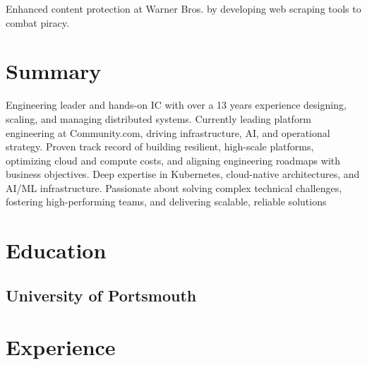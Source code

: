 \documentclass[]{resume}
\begin{document}
\begin{minipage}[t]{0.60\textwidth}
\begin{tightemize}
\item Enhanced content protection at Warner Bros. by developing web scraping tools to combat piracy.
\end{tightemize}
\sectionsep

%
%

\end{minipage}
\hfill
\begin{minipage}[t]{0.33\textwidth}


\section{Summary}
Engineering leader and hands-on IC with over a 13 years experience designing, scaling, and managing distributed systems. Currently leading platform engineering at Community.com, driving infrastructure, AI, and operational strategy. Proven track record of building resilient, high-scale platforms, optimizing cloud and compute costs, and aligning engineering roadmaps with business objectives. Deep expertise in Kubernetes, cloud-native architectures, and AI/ML infrastructure. Passionate about solving complex technical challenges, fostering high-performing teams, and delivering scalable, reliable solutions
\sectionsep


\section{Education}

\subsection{University of Portsmouth}
\sectionsep


\section{Experience}

\end{minipage}
\end{document}
